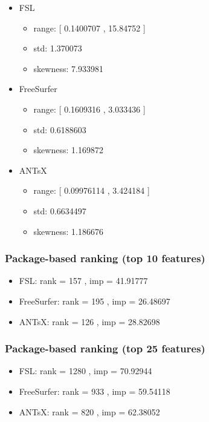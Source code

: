 \documentclass[
  10pt,
]{article}
\begin{document}
\begin{itemize}
\item
  FSL

  \begin{itemize}
  \item
    range: {[} 0.1400707 , 15.84752 {]}
  \item
    std: 1.370073
  \item
    skewness: 7.933981
  \end{itemize}
\item
  FreeSurfer

  \begin{itemize}
  \item
    range: {[} 0.1609316 , 3.033436 {]}
  \item
    std: 0.6188603
  \item
    skewness: 1.169872
  \end{itemize}
\item
  ANTsX

  \begin{itemize}
  \item
    range: {[} 0.09976114 , 3.424184 {]}
  \item
    std: 0.6634497
  \item
    skewness: 1.186676
  \end{itemize}
\end{itemize}

\hypertarget{package-based-ranking-top-10-features-7}{%
\subsubsection{Package-based ranking (top 10
features)}\label{package-based-ranking-top-10-features-7}}

\begin{itemize}
\item
  FSL: rank = 157 , imp = 41.91777
\item
  FreeSurfer: rank = 195 , imp = 26.48697
\item
  ANTsX: rank = 126 , imp = 28.82698
\end{itemize}

\hypertarget{package-based-ranking-top-25-features-7}{%
\subsubsection{Package-based ranking (top 25
features)}\label{package-based-ranking-top-25-features-7}}

\begin{itemize}
\item
  FSL: rank = 1280 , imp = 70.92944
\item
  FreeSurfer: rank = 933 , imp = 59.54118
\item
  ANTsX: rank = 820 , imp = 62.38052
\end{itemize}
\end{document}
